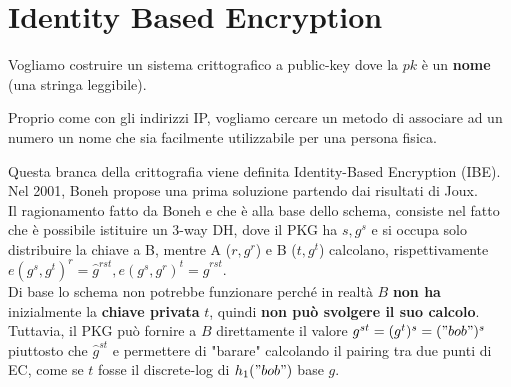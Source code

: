 \section{Identity Based Encryption}
\begin{problem}
Vogliamo costruire un sistema crittografico a public-key dove la $pk$ è un \textbf{nome} (una stringa leggibile).
\end{problem}
\begin{note}
Proprio come con gli indirizzi IP, vogliamo cercare un metodo di associare ad un numero un nome che sia facilmente utilizzabile per una persona fisica.
\end{note}
Questa branca della crittografia viene definita Identity-Based Encryption (IBE). Nel 2001, Boneh propose una prima soluzione partendo dai risultati di Joux.\\
Il ragionamento fatto da Boneh e che è alla base dello schema, consiste nel fatto che è possibile istituire un 3-way DH, dove il PKG ha $s,g^s$ e si occupa solo distribuire la chiave a B, mentre A ($r,g^r$) e B ($t,g^t$) calcolano, rispettivamente $e(g^s,g^t)^r=\hat{g}^{rst},e(g^s,g^r)^t=\hat{g}^{rst}$.\\
Di base lo schema non potrebbe funzionare perché in realtà $B$ \textbf{non ha} inizialmente la \textbf{chiave privata} $t$, quindi \textbf{non può svolgere il suo calcolo}. Tuttavia, il PKG può fornire a $B$ direttamente il valore $g^{st}=(g^t)^s=("bob")^s$ piuttosto che $\hat{g}^{st}$ e permettere di "barare" calcolando il pairing tra due punti di EC, come se $t$ fosse il discrete-log di $h_1("bob")$ base $g$.
